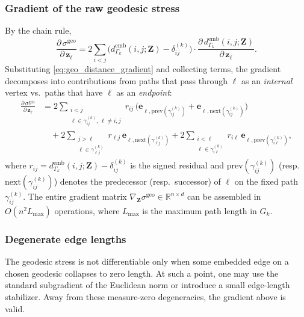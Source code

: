 \documentclass[11pt]{article}
\newcommand{\R}{\mathbb{R}}
\newcommand{\bz}{\mathbf{z}}
\newcommand{\bZ}{\mathbf{Z}}
\newcommand{\demb}{d^{\mathrm{emb}}}
\newcommand{\Gk}{G_k}
\begin{document}
\subsubsection*{Gradient of the raw geodesic stress}
By the chain rule,
\begin{equation}
  \frac{\partial\, \sigma^{\mathrm{geo}}}{\partial\, \bz_\ell}
  = 2 \sum_{i < j}
    \bigl(\demb_{\Gamma_k}(i,j;\bZ) - \delta^{(k)}_{ij}\bigr)
    \cdot \frac{\partial\, \demb_{\Gamma_k}(i,j;\bZ)}{\partial\, \bz_\ell}.
  \label{eq:raw_gradient}
\end{equation}
Substituting \cref{eq:geo_distance_gradient} and collecting terms,
the gradient decomposes into contributions from paths that pass through
$\ell$ as an \emph{internal} vertex vs.\ paths that have $\ell$ as an
\emph{endpoint}:
\begin{align}
  \frac{\partial\, \sigma^{\mathrm{geo}}}{\partial\, \bz_\ell}
  &= 2 \sum_{\substack{i < j \\ \ell \in \gamma_{ij}^{(k)},\, \ell \neq i,j}}
     \!\!\!\!\!\!
     r_{ij}\,\bigl(\mathbf{e}_{\ell,\mathrm{prev}(\gamma_{ij}^{(k)})}
                   + \mathbf{e}_{\ell,\mathrm{next}(\gamma_{ij}^{(k)})}\bigr)
     \nonumber \\
  &\quad + 2\sum_{\substack{j > \ell \\ \ell \in \gamma_{\ell j}^{(k)}}}
     r_{\ell j}\,\mathbf{e}_{\ell,\mathrm{next}(\gamma_{\ell j}^{(k)})}
     + 2\sum_{\substack{i < \ell \\ \ell \in \gamma_{i\ell}^{(k)}}}
     r_{i\ell}\,\mathbf{e}_{\ell,\mathrm{prev}(\gamma_{i\ell}^{(k)})},
  \label{eq:full_gradient}
\end{align}
where $r_{ij} = \demb_{\Gamma_k}(i,j;\bZ) - \delta^{(k)}_{ij}$ is the signed
residual and $\mathrm{prev}(\gamma_{ij}^{(k)})$ (resp.\
$\mathrm{next}(\gamma_{ij}^{(k)})$) denotes the predecessor (resp.\
successor) of $\ell$ on the fixed path $\gamma_{ij}^{(k)}$.  The entire
gradient matrix $\nabla_{\bZ} \sigma^{\mathrm{geo}}
\in \R^{n \times d}$ can be assembled in $O(n^2 L_{\max})$ operations,
where $L_{\max}$ is the maximum path length in $\Gk$.

\subsubsection*{Degenerate edge lengths}
The geodesic stress is not differentiable only when some embedded edge on
a chosen geodesic collapses to zero length.  At such a point, one may use
the standard subgradient of the Euclidean norm or introduce a small
edge-length stabilizer.  Away from these measure-zero degeneracies, the
gradient above is valid.
\end{document}
